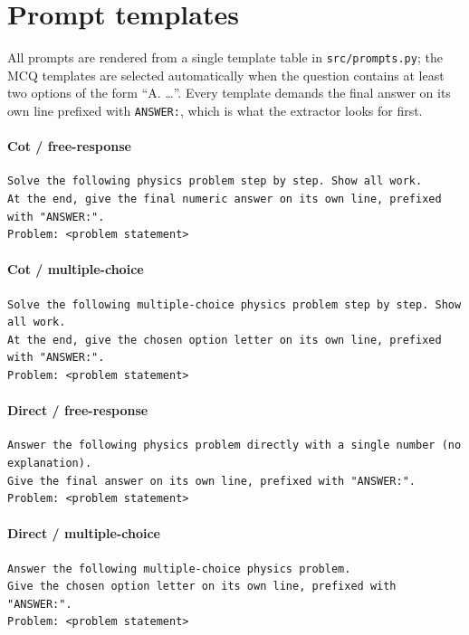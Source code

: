 

\section{Prompt templates}
\label{app:prompts}
All prompts are rendered from a single template table in \texttt{src/prompts.py};
the MCQ templates are selected automatically when the question contains at least two
options of the form ``A. \dots''. Every template demands the final answer on its own
line prefixed with \texttt{ANSWER:}, which is what the extractor looks for first.

\paragraph{Cot / free-response}
{\footnotesize\begin{verbatim}  
Solve the following physics problem step by step. Show all work.
At the end, give the final numeric answer on its own line, prefixed with "ANSWER:".
Problem: <problem statement>
\end{verbatim}}
\paragraph{Cot / multiple-choice}
{\footnotesize\begin{verbatim}  
Solve the following multiple-choice physics problem step by step. Show all work.
At the end, give the chosen option letter on its own line, prefixed with "ANSWER:".
Problem: <problem statement>
\end{verbatim}}
\paragraph{Direct / free-response}
{\footnotesize\begin{verbatim}  
Answer the following physics problem directly with a single number (no explanation).
Give the final answer on its own line, prefixed with "ANSWER:".
Problem: <problem statement>
\end{verbatim}}
\paragraph{Direct / multiple-choice}
{\footnotesize\begin{verbatim}  
Answer the following multiple-choice physics problem.
Give the chosen option letter on its own line, prefixed with "ANSWER:".
Problem: <problem statement>
\end{verbatim}}
